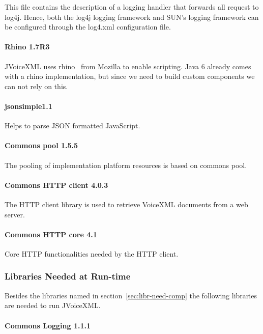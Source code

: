 \documentclass[11pt,a4paper]{article}
\begin{document}
This file contains the description of a logging handler that forwards all
request to log4j. Hence, both the log4j logging framework and SUN's logging
framework can be configured through the log4.xml configuration file.

\paragraph{Rhino 1.7R3}

JVoiceXML uses rhino~\cite{rhino} from Mozilla to enable scripting.
Java 6 already comes with a rhino implementation, but since we need to
build custom components we can not rely on this.

\paragraph{jsonsimple1.1}

Helps to parse JSON formatted JavaScript.

\paragraph{Commons pool 1.5.5}

The pooling of implementation platform resources is based on commons
pool.

\paragraph{Commons HTTP client 4.0.3}

The HTTP client library is used to retrieve VoiceXML documents from a web
server.

\paragraph{Commons HTTP core 4.1}

Core HTTP functionalities needed by the HTTP client.

\subsubsection{Libraries Needed at Run-time}

Besides the libraries named in section~\ref{sec:libr-need-comp} the following
libraries are needed to run JVoiceXML.

\paragraph{Commons Logging 1.1.1}
\label{sec:commons-logging}
\end{document}
